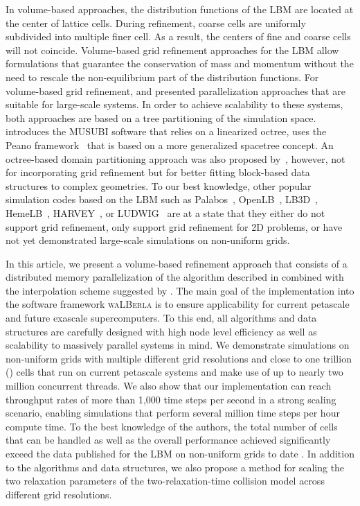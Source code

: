 \documentclass[final,leqno,onefignum,onetabnum]{siamltex1213}
\newcommand{\Walberla}{\textsc{waLBerla}}
\begin{document}
In volume-based approaches, the distribution functions of the LBM are located at the center of lattice cells.
During refinement, coarse cells are uniformly subdivided into multiple finer cell.
As a result, the centers of fine and coarse cells will not coincide.
Volume-based grid refinement approaches for the LBM allow formulations that
guarantee the conservation of mass and momentum without
the need to rescale the non-equilibrium part of the distribution functions.
For volume-based grid refinement, \cite{Neumann2013} and \cite{Hasert2014784} presented parallelization
approaches that are suitable for large-scale systems.
In order to achieve scalability to these systems, both approaches are based on a tree partitioning of the simulation space.
\cite{Hasert2014784} introduces the MUSUBI software that relies on a linearized octree,
\cite{Neumann2013} uses the Peano framework~\cite{Bungartz2010} that is based on a more generalized spacetree concept.
An octree-based domain partitioning approach was also proposed by~\cite{fietz2012}, however,
not for incorporating grid refinement but for better fitting block-based data structures to complex geometries.
To our best knowledge, other popular simulation codes based on the LBM such as Palabos~\cite{palabos,Lagrava20124808}, OpenLB~\cite{heuveline2007,heuveline2009,krause2010}, LB3D~\cite{lb3d,groen2011},
HemeLB~\cite{Groen2013412}, HARVEY~\cite{Randles2013}, or LUDWIG~\cite{Desplat2001273} are at a state that they either do not support grid refinement,
only support grid refinement for 2D problems, or have not yet demonstrated large-scale simulations on non-uniform grids.

In this article, we present a volume-based refinement approach that consists of a distributed memory parallelization
of the algorithm described in \cite{Rohde2006} combined with the interpolation scheme suggested by \cite{Chen2006}.
The main goal of the implementation into the software framework \Walberla{} is to ensure
applicability for current petascale and future exascale supercomputers.
To this end, all algorithms and data structures are carefully designed
with high node level efficiency as well as scalability to massively parallel systems in mind.
We demonstrate simulations on non-uniform grids with multiple different grid
resolutions and close to one trillion () cells that run on current petascale systems
and make use of up to nearly two million concurrent threads.
We also show that our implementation can reach throughput rates of more than
1,000 time steps per second in a strong scaling scenario,
enabling simulations that perform several million time steps per hour compute time.
To the best knowledge of the authors, the total number of cells that can be handled
as well as the overall performance achieved
significantly exceed the data
published for the LBM on non-uniform grids to date \cite{Freudiger08,Schoenherr20113730,FLD:FLD2469,Hasert2014784}.
In addition to the algorithms and data structures,
we also propose a method for scaling the two relaxation parameters of the two-relaxation-time collision model across different grid resolutions.
\end{document}
